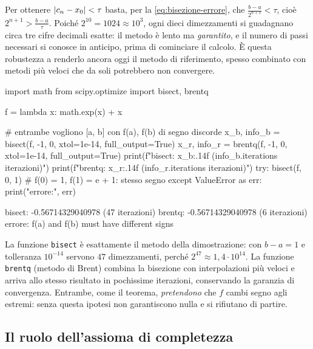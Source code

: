 \begin{osservazione}\label{oss:passi-bisezione}
Per ottenere $\lvert c_{n}-x_{0}\rvert<\tau$ basta, per la \eqref{eq:bisezione-errore}, che
$\frac{b-a}{2^{n+1}}<\tau$, cioè $2^{n+1}>\frac{b-a}\tau$. Poiché $2^{10}=1024\approx10^{3}$,
ogni dieci dimezzamenti si guadagnano circa tre cifre decimali esatte: il metodo è
lento ma \emph{garantito}, e il numero di passi necessari si conosce in anticipo, prima
di cominciare il calcolo. È questa robustezza a renderlo ancora oggi il metodo di
riferimento, spesso combinato con metodi più veloci che da soli potrebbero non
convergere.
\end{osservazione}

\begin{python}
import math
from scipy.optimize import bisect, brentq

f = lambda x: math.exp(x) + x

# entrambe vogliono [a, b] con f(a), f(b) di segno discorde
x_b, info_b = bisect(f, -1, 0, xtol=1e-14, full_output=True)
x_r, info_r = brentq(f, -1, 0, xtol=1e-14, full_output=True)
print(f"bisect: {x_b:.14f}  ({info_b.iterations} iterazioni)")
print(f"brentq: {x_r:.14f}  ({info_r.iterations} iterazioni)")
try:
    bisect(f, 0, 1)            # f(0) = 1, f(1) = e + 1: stesso segno
except ValueError as err:
    print("errore:", err)
\end{python}
\begin{risultato}
bisect: -0.56714329040978  (47 iterazioni)
brentq: -0.56714329040978  (6 iterazioni)
errore: f(a) and f(b) must have different signs
\end{risultato}

La funzione \texttt{bisect} è esattamente il metodo della dimostrazione: con
$b-a=1$ e tolleranza $10^{-14}$ servono $47$ dimezzamenti, perché $2^{47}\approx1{,}4\cdot10^{14}$.
La funzione \texttt{brentq} (metodo di Brent) combina la bisezione con interpolazioni
più veloci e arriva allo stesso risultato in pochissime iterazioni, conservando la
garanzia di convergenza. Entrambe, come il teorema, \emph{pretendono} che $f$ cambi
segno agli estremi: senza questa ipotesi non garantiscono nulla e si rifiutano di
partire.

\subsection{Il ruolo dell'assioma di completezza}

